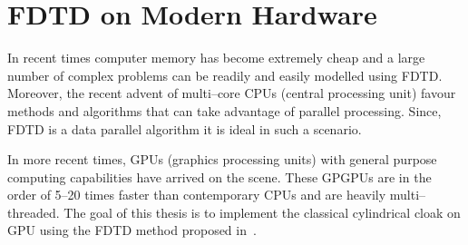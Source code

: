 \section{FDTD on Modern Hardware}
In recent times computer memory has become extremely cheap and a large number of complex problems can be readily and easily modelled using FDTD. Moreover, the recent advent of multi--core CPUs (central processing unit) favour methods and algorithms that can take advantage of parallel processing. Since, FDTD is a data parallel algorithm it is ideal in such a scenario.

In more recent times, GPUs (graphics processing units) with general purpose computing capabilities have arrived on the scene. These GPGPUs are in the order of 5--20 times faster than contemporary CPUs and are heavily multi--threaded. The goal of this thesis is to implement the classical cylindrical cloak on GPU using the FDTD method proposed in~\cite{Radial-Zhao}.
